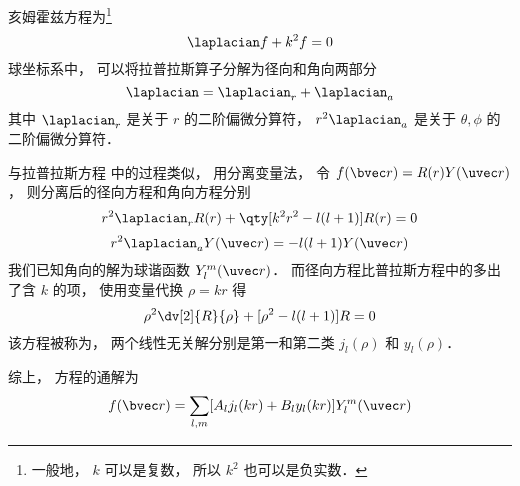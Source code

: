 

亥姆霍兹方程为\footnote{一般地， $k$ 可以是复数， 所以 $k^2$ 也可以是负实数．}
\begin{equation}
\laplacian f + k^2 f = 0
\end{equation}
球坐标系中， 可以将拉普拉斯算子分解为径向和角向两部分
\begin{equation}
\laplacian = \laplacian_r + \laplacian_{a}
\end{equation}
其中 $\laplacian_r$ 是关于 $r$ 的二阶偏微分算符， $r^2\laplacian_{a}$ 是关于 $\theta, \phi$ 的二阶偏微分算符．

与拉普拉斯方程 中的过程类似， 用分离变量法， 令 $f(\bvec r) = R(r) Y(\uvec r)$， 则分离后的径向方程和角向方程分别
\begin{equation}
r^2\laplacian_r R(r) + \qty[k^2 r^2 - l(l+1)] R(r) = 0
\end{equation}
\begin{equation}
r^2 \laplacian_{a} Y(\uvec r) = -l(l+1) Y(\uvec r)
\end{equation}
我们已知角向的解为球谐函数 $Y_l^m(\uvec r)$． 而径向方程比普拉斯方程中的多出了含 $k$ 的项， 使用变量代换 $\rho = kr$ 得
\begin{equation}
\rho^2\dv[2]{R}{\rho} + [\rho^2 - l(l+1)] R = 0
\end{equation}
该方程被称为， 两个线性无关解分别是第一和第二类 $j_l(\rho)$ 和 $y_l(\rho)$．

综上， 方程的通解为
\begin{equation}
f(\bvec r) = \sum_{l,m} [A_l j_l(kr) + B_l y_l(kr)] Y_l^m(\uvec r)
\end{equation}
